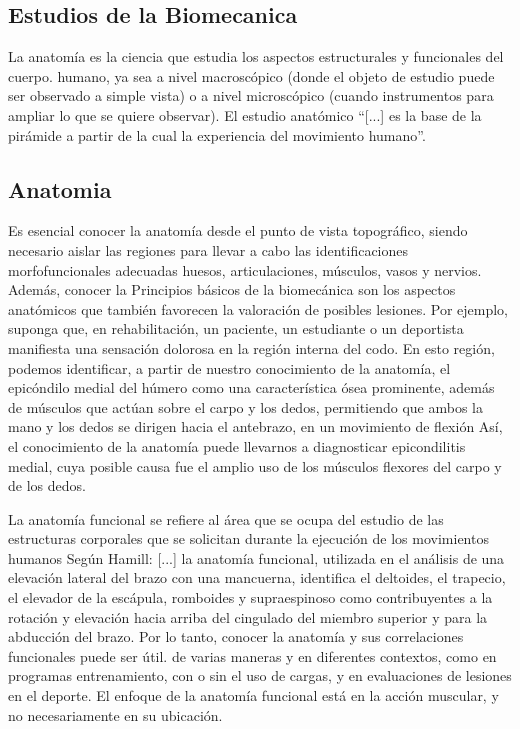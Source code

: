 \documentclass{article}
\begin{document}
\subsection{Estudios de la Biomecanica}

La anatomía es la ciencia que estudia los aspectos estructurales y funcionales del cuerpo. humano, ya sea a nivel macroscópico (donde el objeto de estudio puede ser observado a simple vista) o a nivel microscópico (cuando instrumentos para ampliar lo que se quiere observar). 
El estudio anatómico “[...] es la base de la pirámide a partir de la cual la experiencia del movimiento humano”. \cite{ff6}

\subsection{Anatomia}

 Es esencial conocer la anatomía desde el punto de vista topográfico, siendo necesario aislar las regiones para llevar a cabo las identificaciones morfofuncionales adecuadas huesos, articulaciones, músculos, vasos y nervios. Además, conocer la Principios básicos de la biomecánica son  los aspectos anatómicos que también favorecen la valoración de posibles lesiones. Por ejemplo, suponga que, en rehabilitación, un paciente, un estudiante o un deportista manifiesta una sensación dolorosa en la región interna del codo. En esto región, podemos identificar, a partir de nuestro conocimiento de la anatomía, el epicóndilo medial del húmero como una característica ósea prominente, además de músculos que actúan sobre el carpo y los dedos, permitiendo que ambos la mano y los dedos se dirigen hacia el antebrazo, en un movimiento de flexión Así, el conocimiento de la anatomía puede llevarnos a diagnosticar epicondilitis medial, cuya posible causa fue el amplio uso de los músculos flexores del carpo y de los dedos. 

La anatomía funcional se refiere al área que se ocupa del estudio de las estructuras corporales que se solicitan durante la ejecución de los movimientos humanos Según Hamill: [...] la anatomía funcional, utilizada en el análisis de una elevación lateral del brazo con una mancuerna, identifica el deltoides, el trapecio, el elevador de la escápula, romboides y supraespinoso como contribuyentes a la rotación y elevación hacia arriba del cingulado del miembro superior y para la abducción del brazo. 
Por lo tanto, conocer la anatomía y sus correlaciones funcionales puede ser útil. de varias maneras y en diferentes contextos, como en programas entrenamiento, con o sin el uso de cargas, y en evaluaciones de lesiones en el deporte. El enfoque de la anatomía funcional está en la acción muscular, y no necesariamente en su ubicación. \cite{ff6}
\end{document}
